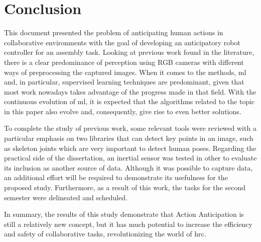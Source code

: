 \chapter{Conclusion}
\label{chapter:conclusion}

This document presented the problem of anticipating human actions in collaborative environments with the goal of developing an anticipatory robot controller for an assembly task. Looking at previous work found in the literature, there is a clear predominance of perception using RGB cameras with different ways of preprocessing the captured images. When it comes to the methods, \acl{ml} and, in particular, supervised learning techniques are predominant, given that most work nowadays takes advantage of the progress made in that field. With the continuous evolution of \acs{ml}, it is expected that the algorithms related to the topic in this paper also evolve and, consequently, give rise to even better solutions. 

To complete the study of previous work, some relevant tools were reviewed with a particular emphasis on two libraries that can detect key points in an image, such as skeleton joints which are very important to detect human poses. Regarding the practical side of the dissertation, an inertial sensor was tested in other to evaluate its inclusion as another source of data. Although it was possible to capture data, an additional effort will be required to demonstrate its usefulness for the proposed study. Furthermore, as a result of this work, the tasks for the second semester were delineated and scheduled.

In summary, the results of this study demonstrate that Action Anticipation is still a relatively new concept, but it has much potential to increase the efficiency and safety of collaborative tasks, revolutionizing the world of \acl{hrc}.